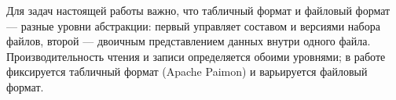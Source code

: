 Для задач настоящей работы важно, что табличный формат и файловый формат --- разные
уровни абстракции: первый управляет составом и версиями набора файлов, второй ---
двоичным представлением данных внутри одного файла. Производительность чтения и
записи определяется обоими уровнями; в работе фиксируется табличный формат (Apache
Paimon) и варьируется файловый формат.
